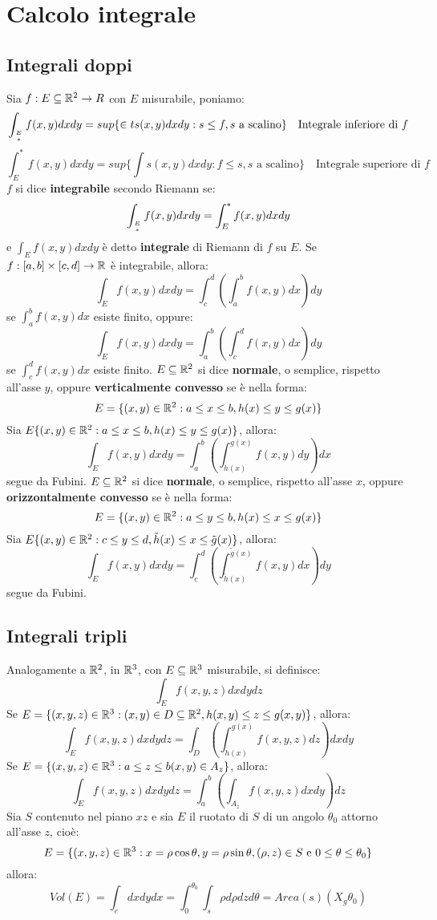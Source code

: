 \chapter{Calcolo integrale}
	\section{Integrali doppi}
	Sia $f:E \subseteq \mathbb{R}^2 \rightarrow R$ con $E$ misurabile, poniamo:
	$$\int_{\genfrac{}{}{0pt}{}{E}{*}} f(x,y)  dxdy=sup\{\in ts(x,y)dxdy: s\le f, s \text{ a scalino}\} \quad \text{Integrale inferiore di }f$$
	$$\int_E^* f(x,y)  dxdy=sup\{\int s(x,y)dxdy: f\le s, s \text{ a scalino}\} \quad \text{Integrale superiore di }f$$
	$f$ si dice \textbf{integrabile} secondo Riemann se:
	$$\int_{\genfrac{}{}{0pt}{}{E}{*}} f(x,y)  dxdy = \int_E^* f(x,y)  dxdy$$
	e $\int_E f(x,y)  dxdy$ è detto \textbf{integrale} di Riemann di $f$ su $E$.
	Se $f:[a,b]\times[c,d]\rightarrow \mathbb{R}$ è integrabile, allora:
	$$\int_E f(x,y)  dxdy = \int_{c}^{d} \left(\int_{a}^{b} f(x,y)dx\right) dy$$
	se $\int_a^b f(x,y)dx$ esiste finito, oppure:
	$$\int_E f(x,y)  dxdy = \int_{a}^{b} \left(\int_{c}^{d} f(x,y)dx\right) dy$$
	se $\int_c^d f(x,y)dx$ esiste finito.
	$E\subseteq \mathbb{R}^2$ si dice \textbf{normale}, o semplice, rispetto all'asse $y$, oppure \textbf{verticalmente convesso} se è nella forma:
	$$E=\{(x,y)\in\mathbb{R}^2:a\le x \le b, h(x) \le y \le g(x)\}$$
	\prop
	Sia $E\{(x,y)\in\mathbb{R}^2:a\le x \le b, h(x) \le y \le g(x)\}$, allora:
	$$\int_E f(x,y) dxdy=\int_a^b\left(\int_{h(x)}^{g(x)}f(x,y)dy\right)dx$$
	segue da Fubini.
	$E\subseteq \mathbb{R}^2$ si dice \textbf{normale}, o semplice, rispetto all'asse $x$, oppure \textbf{orizzontalmente convesso} se è nella forma:
	$$E=\{(x,y)\in\mathbb{R}^2:a\le y \le b, h(x) \le x \le g(x)\}$$
	\prop
	Sia $E\{(x,y)\in\mathbb{R}^2:c\le y \le d, \tilde h(x) \le x \le \tilde g(x)\}$, allora:
	$$\int_E f(x,y) dxdy=\int_c^d\left(\int_{\tilde h(x)}^{\tilde g(x)}f(x,y)dx\right)dy$$
	segue da Fubini.
	\section{Integrali tripli}
	Analogamente a $\mathbb{R}^2$, in $\mathbb{R}^3$, con $E \subseteq \mathbb{R}^3$ misurabile, si definisce:
	$$\int_E f(x,y,z)  dxdydz$$
	Se $E=\{(x,y,z)\in\mathbb{R}^3:(x,y)\in D \subseteq \mathbb{R}^2, h(x,y) \le z \le g(x,y)\}$, allora:
	$$\int_E f(x,y,z) dxdydz=\int_D\left(\int_{h(x)}^{g(x)}f(x,y,z)dz\right)dxdy$$
	Se $E=\{(x,y,z)\in\mathbb{R}^3:a\le z\le b(x,y)\in A_z\}$, allora:
	$$\int_E f(x,y,z) dxdydz=\int_a^b\left(\int_{A_z}f(x,y,z)dxdy\right)dz$$
	Sia $S$ contenuto nel piano $xz$ e sia $E$ il ruotato di $S$ di un angolo $\theta_0$ attorno all'asse $z$, cioè:
	$$E=\{(x,y,z)\in\mathbb{R}^3:x=\rho \cos \theta, y=\rho \sin \theta, (\rho,z)\in S \text{ e } 0 \le \theta \le \theta_0\}$$
	allora:
	$$Vol(E)=\int_e dxdydx=\int_0^{\theta_0}\int_s \rho d\rho dz d\theta=Area(s)(X_g \theta_0)$$
